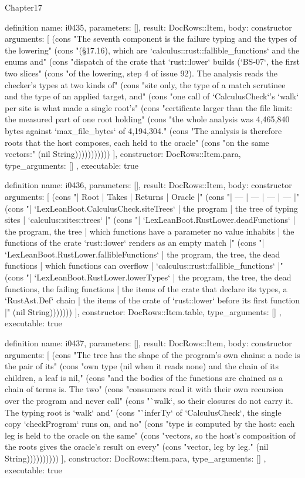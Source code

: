 \begin{lexlean}{Chapter17}
\begin{semanticmodule}
definition{
  name: i0435,
  parameters: [],
  result: DocRows::Item,
  body: constructor{
    arguments: [
      (cons "The seventh component is the failure typing and the types of the lowering" (cons "(§17.16), which are `calculus::rust::fallible_functions` and the enums and" (cons "dispatch of the crate that `rust::lower` builds (`BS-07`, the first two slices" (cons "of the lowering, step 4 of issue 92). The analysis reads the checker's types at two kinds of" (cons "site only, the type of a match scrutinee and the type of an applied target, and" (cons "one call of `CalculusCheck`'s `walk` per site is what made a single root's" (cons "certificate larger than the file limit: the measured part of one root holding" (cons "the whole analysis was 4,465,840 bytes against `max_file_bytes` of 4,194,304." (cons "The analysis is therefore roots that the host composes, each held to the oracle" (cons "on the same vectors:" (nil String)))))))))))
    ],
    constructor: DocRows::Item.para,
    type_arguments: []
  },
  executable: true
}

definition{
  name: i0436,
  parameters: [],
  result: DocRows::Item,
  body: constructor{
    arguments: [
      (cons "| Root | Takes | Returns | Oracle |" (cons "| --- | --- | --- | --- |" (cons "| `LexLeanBoot.CalculusCheck.siteTrees` | the program | the tree of typing sites | `calculus::sites::trees` |" (cons "| `LexLeanBoot.RustLower.deadFunctions` | the program, the tree | which functions have a parameter no value inhabits | the functions of the crate `rust::lower` renders as an empty match |" (cons "| `LexLeanBoot.RustLower.fallibleFunctions` | the program, the tree, the dead functions | which functions can overflow | `calculus::rust::fallible_functions` |" (cons "| `LexLeanBoot.RustLower.lowerTypes` | the program, the tree, the dead functions, the failing functions | the items of the crate that declare its types, a `RustAst.Def` chain | the items of the crate of `rust::lower` before its first function |" (nil String)))))))
    ],
    constructor: DocRows::Item.table,
    type_arguments: []
  },
  executable: true
}

definition{
  name: i0437,
  parameters: [],
  result: DocRows::Item,
  body: constructor{
    arguments: [
      (cons "The tree has the shape of the program's own chains: a node is the pair of its" (cons "own type (nil when it reads none) and the chain of its children, a leaf is nil," (cons "and the bodies of the functions are chained as a chain of terms is. The two" (cons "consumers read it with their own recursion over the program and never call" (cons "`walk`, so their closures do not carry it. The typing root is `walk` and" (cons "`inferTy` of `CalculusCheck`, the single copy `checkProgram` runs on, and no" (cons "type is computed by the host: each leg is held to the oracle on the same" (cons "vectors, so the host's composition of the roots gives the oracle's result on every" (cons "vector, leg by leg." (nil String))))))))))
    ],
    constructor: DocRows::Item.para,
    type_arguments: []
  },
  executable: true
}


\end{semanticmodule}
\end{lexlean}
